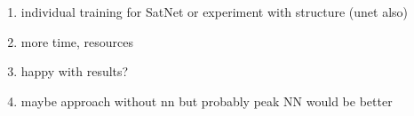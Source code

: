
\begin{enumerate}
  \item individual training for SatNet or experiment with structure (unet also)
  \item more time, resources
  \item happy with results?
  \item maybe approach without nn but probably peak NN would be better
\end{enumerate}
